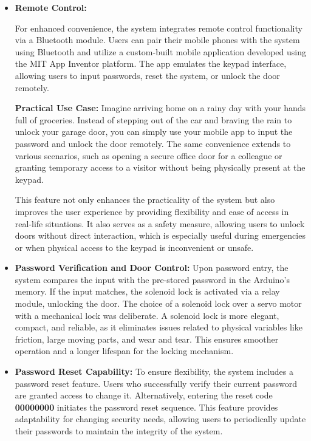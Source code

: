 \documentclass[a4paper, 12pt]{article}
\begin{document}
\begin{itemize}
    \item \textbf{Remote Control:} 

For enhanced convenience, the system integrates remote control functionality via a Bluetooth module. Users can pair their mobile phones with the system using Bluetooth and utilize a custom-built mobile application developed using the MIT App Inventor platform. The app emulates the keypad interface, allowing users to input passwords, reset the system, or unlock the door remotely.

\textbf{Practical Use Case:} 
Imagine arriving home on a rainy day with your hands full of groceries. Instead of stepping out of the car and braving the rain to unlock your garage door, you can simply use your mobile app to input the password and unlock the door remotely. The same convenience extends to various scenarios, such as opening a secure office door for a colleague or granting temporary access to a visitor without being physically present at the keypad.

This feature not only enhances the practicality of the system but also improves the user experience by providing flexibility and ease of access in real-life situations. It also serves as a safety measure, allowing users to unlock doors without direct interaction, which is especially useful during emergencies or when physical access to the keypad is inconvenient or unsafe.


    \item \textbf{Password Verification and Door Control:} 
    Upon password entry, the system compares the input with the pre-stored password in the Arduino’s memory. If the input matches, the solenoid lock is activated via a relay module, unlocking the door. The choice of a solenoid lock over a servo motor with a mechanical lock was deliberate. A solenoid lock is more elegant, compact, and reliable, as it eliminates issues related to physical variables like friction, large moving parts, and wear and tear. This ensures smoother operation and a longer lifespan for the locking mechanism.

    \item \textbf{Password Reset Capability:} 
    To ensure flexibility, the system includes a password reset feature. Users who successfully verify their current password are granted access to change it. Alternatively, entering the reset code \textbf{00000000} initiates the password reset sequence. This feature provides adaptability for changing security needs, allowing users to periodically update their passwords to maintain the integrity of the system.


\end{itemize}
\end{document}
